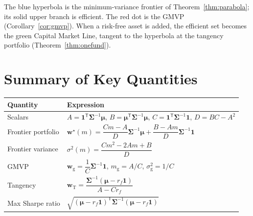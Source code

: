 \documentclass[11pt]{article}
\theoremstyle{definition}
\theoremstyle{plain}
\newcommand{\one}{\mathbf{1}}
\newcommand{\bw}{\bm{w}}
\newcommand{\bmu}{\bm{\mu}}
\newcommand{\bSigma}{\bm{\Sigma}}
\newcommand{\T}{^{\mathsf{T}}}
\begin{document}
\noindent The blue hyperbola is the minimum-variance frontier of
Theorem~\ref{thm:parabola}; its solid upper branch is efficient. The red dot is
the GMVP (Corollary~\ref{cor:gmvp}). When a risk-free asset is added, the
efficient set becomes the green Capital Market Line, tangent to the hyperbola at
the tangency portfolio (Theorem~\ref{thm:onefund}).

\section*{Summary of Key Quantities}

\begin{center}
\renewcommand{\arraystretch}{1.5}
\begin{tabular}{ll}
\hline
Quantity & Expression \\
\hline
Scalars & $A = \one\T\bSigma^{-1}\bmu$, \;
           $B = \bmu\T\bSigma^{-1}\bmu$, \;
           $C = \one\T\bSigma^{-1}\one$, \;
           $D = BC - A^2$ \\
Frontier portfolio & $\bw^\star(m) = \dfrac{Cm-A}{D}\bSigma^{-1}\bmu
                       + \dfrac{B-Am}{D}\bSigma^{-1}\one$ \\
Frontier variance & $\sigma^2(m) = \dfrac{Cm^2 - 2Am + B}{D}$ \\
GMVP & $\bw_{\mathrm{g}} = \dfrac{1}{C}\bSigma^{-1}\one$, \;
       $m_{\mathrm{g}} = A/C$, \; $\sigma_{\mathrm{g}}^2 = 1/C$ \\
Tangency & $\bw_{\mathrm{T}} = \dfrac{\bSigma^{-1}(\bmu - r_f\one)}{A - Cr_f}$ \\
Max Sharpe ratio & $\sqrt{(\bmu - r_f\one)\T\bSigma^{-1}(\bmu - r_f\one)}$ \\
\hline
\end{tabular}
\end{center}
\end{document}

